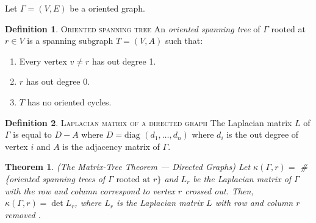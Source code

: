 \documentclass[11pt]{article}
\newtheorem{theorem}{Theorem}[section]
\theoremstyle{definition}
\newtheorem{definition}{Definition}[section]
\begin{document}
	Let $\Gamma = (V,E)$ be a oriented graph.
	
	\theoremstyle{definition}
	\begin{definition}{\textsc{Oriented spanning tree}}
			An \emph{oriented spanning tree} of $\Gamma$ rooted at $r \in V$ is a spanning subgraph $T = (V,A)$ such that:
			\begin{enumerate}
				\item Every vertex $v \neq r$ has out degree 1.
				\item $r$ has out degree 0.
				\item $T$ has no oriented cycles.
			\end{enumerate}
	\end{definition}
	
	\theoremstyle{definition}
	\begin{definition}{\textsc{Laplacian matrix of a directed graph}}
			The Laplacian matrix $L$ of $\Gamma$ is equal to $D-A$ where $D = \text{diag } (d_1, \dots, d_n)$ where $d_i$ is the out degree of vertex $i$ and $A$ is the adjacency matrix of $\Gamma$.
	\end{definition}
	
	\begin{theorem}{(The Matrix-Tree Theorem --- Directed Graphs)}
			Let $\kappa(\Gamma, r) =$ \# \{oriented spanning trees of $\Gamma \text{ rooted at } r\}$ and $L_r$ be the Laplacian matrix of $\Gamma$ with the row and column correspond to vertex $r$ crossed out. 
			Then, $\kappa(\Gamma, r) = \det L_r$, where $L_r$ is the Laplacian matrix $L$ with row and column $r$ removed \cite{matrixTree}.
	\end{theorem}
	
\end{document}
